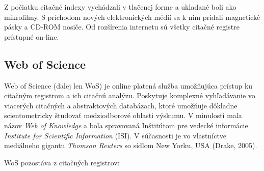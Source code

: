 Z počiatku citačné indexy vychádzali v tlačenej forme a ukladané boli ako
mikrofilmy.  S príchodom nových elektronických médií sa k nim pridali magnetické
pásky a CD-ROM nosiče.  Od rozšírenia internetu sú všetky citačné registre
prístupné on-line.

\subsection{Web of Science}

Web of Science (ďalej len WoS) je online platená služba umožňujúca prístup ku
citačným registrom a ich citačnú analýzu.  Poskytuje komplexné vyhľadávanie vo
viacerých citačných a abstraktových databázach, ktoré umožňuje dôkladne
scientometricky študovať medziodborové oblasti výskumu.  V minulosti mala názov
\emph{Web of Knowledge} a bola spravovaná Inštitútom pre vedecké informácie
\emph{Institute for Scientific Information} (ISI).  V súčasnosti je vo
vlastníctve mediálneho gigantu \emph{Thomson Reuters} so sídlom New Yorku, USA
(Drake, 2005).

WoS pozostáva z citačných registrov:

